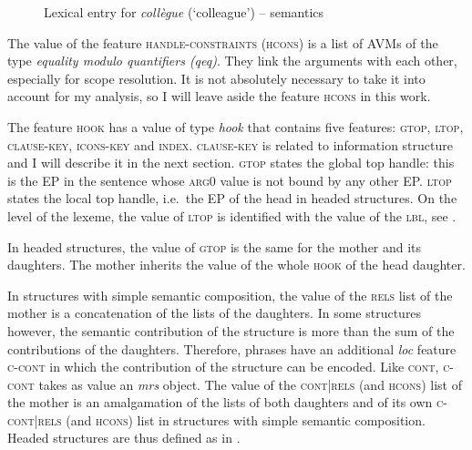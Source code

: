 \begin{figure}[h]
\caption{Lexical entry for \emph{collègue} (`colleague') -- semantics}\label{avm:collegue-semantics}
\end{figure}


The value of the feature \textsc{handle-constraints (hcons)} is a list of AVMs of the type \emph{equality modulo quantifiers (qeq)}. They link the arguments with each other, especially for scope resolution. It is not absolutely necessary to take it into account for my analysis, so I will leave aside the feature \textsc{hcons} in this work.

The feature \textsc{hook} has a value of type \emph{hook} that contains five features: \textsc{gtop}, \textsc{ltop}, \textsc{clause-key}, \textsc{icons-key} and \textsc{index}. \textsc{clause-key} is related to information structure and I will describe it in the next section. \textsc{gtop} states the global top handle: this is the EP in the sentence whose \textsc{arg0} value is not bound by any other EP. %
\textsc{ltop} states the local top handle, i.e.\ the EP of the head in headed structures. On the level of the lexeme, the value of \textsc{ltop} is identified with the value of the \textsc{lbl}, see .

In headed structures, the value of \textsc{gtop} is the same for the mother and its daughters. The mother inherits the value of the whole \textsc{hook} of the head daughter. 

In structures with simple semantic composition, the value of the \textsc{rels} list of the mother is a concatenation of the lists of the daughters. In some structures however, the semantic contribution of the structure is more than the sum of the contributions of the daughters. Therefore, phrases have an additional \emph{loc} feature \textsc{c-cont} in which the contribution of the structure can be encoded. Like \textsc{cont}, \textsc{c-cont} takes as value an \emph{mrs} object. The value of the \textsc{cont|rels} (and \textsc{hcons}) list of the mother is an amalgamation of the lists of both daughters and of its own \textsc{c-cont|rels} (and \textsc{hcons}) list in structures with simple semantic composition.
Headed structures are thus defined as in .

